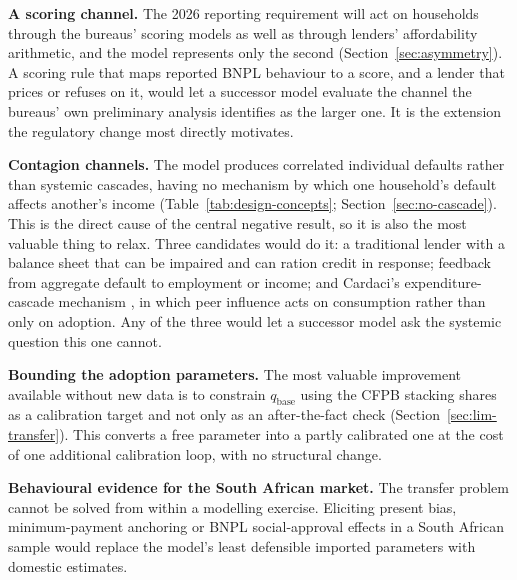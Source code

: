 \textbf{A scoring channel.} The 2026 reporting requirement will act on households through the
bureaus' scoring models as well as through lenders' affordability arithmetic, and the model
represents only the second (Section~\ref{sec:asymmetry}). A scoring rule that maps reported
\ac{BNPL} behaviour to a score, and a lender that prices or refuses on it, would let a successor
model evaluate the channel the bureaus' own preliminary analysis identifies as the larger one.
It is the extension the regulatory change most directly motivates.

\textbf{Contagion channels.} The model produces correlated individual defaults rather than systemic
cascades, having no mechanism by which one household's default affects another's income
(Table~\ref{tab:design-concepts}; Section~\ref{sec:no-cascade}). This is the direct cause of the
central negative result, so it is also the most valuable thing to relax. Three candidates would do
it: a traditional lender with a balance sheet that can be impaired and can ration credit in
response; feedback from aggregate default to employment or income; and Cardaci's
expenditure-cascade mechanism \cite{cardaci2018inequality}, in which peer influence acts on
consumption rather than only on adoption. Any of the three would let a successor model ask the
systemic question this one cannot.

\textbf{Bounding the adoption parameters.} The most valuable improvement available without new data
is to constrain $q_{\text{base}}$ using the \ac{CFPB} stacking shares as a calibration target and
not only as an after-the-fact check (Section~\ref{sec:lim-transfer}). This converts a free
parameter into a partly calibrated one at the cost of one additional calibration loop, with no
structural change.

\textbf{Behavioural evidence for the South African market.} The transfer problem cannot be solved
from within a modelling exercise. Eliciting present bias, minimum-payment anchoring or \ac{BNPL}
social-approval effects in a South African sample would replace the model's least defensible
imported parameters with domestic estimates.
